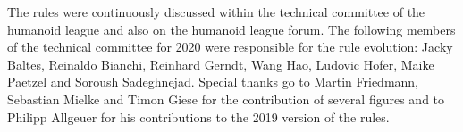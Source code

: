 The rules were continuously discussed within the technical committee of the
humanoid league and also on the humanoid league forum.
The following members of the technical committee for 2020 were responsible for
the rule evolution: Jacky Baltes, Reinaldo Bianchi, Reinhard Gerndt, Wang Hao,
Ludovic Hofer, Maike Paetzel and Soroush Sadeghnejad.
Special thanks go to Martin Friedmann, Sebastian Mielke and Timon Giese for the
contribution of several figures and to Philipp Allgeuer for his contributions to
the 2019 version of the rules.
